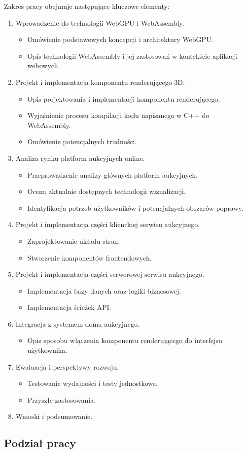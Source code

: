 Zakres pracy obejmuje następujące kluczowe elementy:
\begin{enumerate}
  \item Wprowadzenie do technologii WebGPU i WebAssembly.
    \begin{itemize}
      \item Omówienie podstawowych koncepcji i architektury WebGPU.
      \item Opis technologii WebAssembly i jej zastosowań w kontekście aplikacji webowych.
    \end{itemize}
  \item Projekt i implementacja komponentu renderującego 3D.
  \begin{itemize}
    \item Opis projektowania i implementacji komponentu renderującego.
    \item Wyjaśnienie procesu kompilacji kodu napisanego w C++ do WebAssembly.
    \item Omówienie potencjalnych trudności.
  \end{itemize}
  \item Analiza rynku platform aukcyjnych online.
    \begin{itemize}
      \item Przeprowadzenie analizy głównych platform aukcyjnych.
      \item Ocena aktualnie dostępnych technologii wizualizacji.
      \item Identyfikacja potrzeb użytkowników i potencjalnych obszarów poprawy.
    \end{itemize}
  \item Projekt i implementacja części klienckiej serwisu aukcyjnego.
    \begin{itemize}
      \item Zaprojektowanie układu stron.
      \item Stworzenie komponentów frontendowych.
    \end{itemize}
  \item Projekt i implementacja części serwerowej serwisu aukcyjnego.
    \begin{itemize}
      \item Implementacja bazy danych oraz logiki biznesowej.
      \item Implementacja ścieżek API.
    \end{itemize}
  \item Integracja z systemem domu aukcyjnego.
    \begin{itemize}
      \item Opis sposobu włączenia komponentu renderującego do interfejsu użytkownika.
    \end{itemize}
  \item Ewaluacja i perspektywy rozwoju.
    \begin{itemize}
      \item Testowanie wydajności i testy jednostkowe.
      \item Przyszłe zastosowania.
    \end{itemize}
  \item Wnioski i podsumowanie.
\end{enumerate}

\newpage

\subsection{Podział pracy}

\newpage